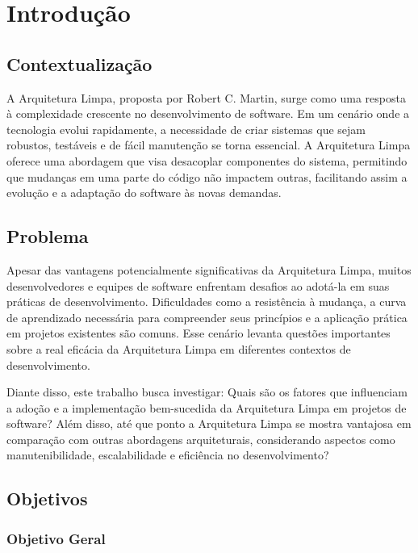 \chapter{Introdução}
    \section{Contextualização}
      \par A Arquitetura Limpa, proposta por Robert C. Martin, surge como uma resposta à complexidade crescente no desenvolvimento de software. Em um cenário onde a tecnologia evolui rapidamente, a necessidade de criar sistemas que sejam robustos, testáveis e de fácil manutenção se torna essencial. A Arquitetura Limpa oferece uma abordagem que visa desacoplar componentes do sistema, permitindo que mudanças em uma parte do código não impactem outras, facilitando assim a evolução e a adaptação do software às novas demandas.

    \section{Problema}
    
     \par Apesar das vantagens potencialmente significativas da Arquitetura Limpa, muitos desenvolvedores e equipes de software enfrentam desafios ao adotá-la em suas práticas de desenvolvimento. Dificuldades como a resistência à mudança, a curva de aprendizado necessária para compreender seus princípios e a aplicação prática em projetos existentes são comuns. Esse cenário levanta questões importantes sobre a real eficácia da Arquitetura Limpa em diferentes contextos de desenvolvimento.

    \par Diante disso, este trabalho busca investigar: Quais são os fatores que influenciam a adoção e a implementação bem-sucedida da Arquitetura Limpa em projetos de software? Além disso, até que ponto a Arquitetura Limpa se mostra vantajosa em comparação com outras abordagens arquiteturais, considerando aspectos como manutenibilidade, escalabilidade e eficiência no desenvolvimento?

    \section{Objetivos}
        \subsection{Objetivo Geral}
    
